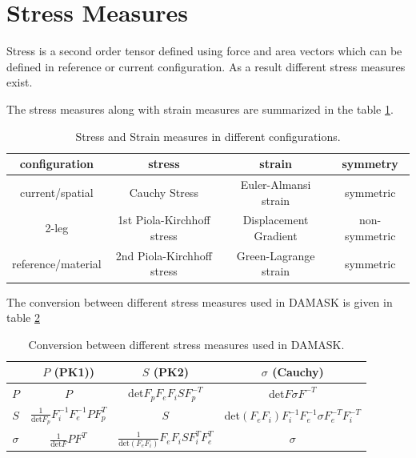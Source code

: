 \section{Stress Measures}
Stress is a second order tensor defined using force and area vectors which can be defined in reference or current configuration. As a result different stress measures exist.

The stress measures along with strain measures are summarized in the table \ref{Stress_Measures_Configurations}. 

\begin{table}[H]
\centering
\caption{Stress and Strain measures in different configurations.}
\renewcommand\arraystretch{1.4}
\renewcommand\baselinestretch{1.4}
\begin{tabular}{c|ccc}
    configuration & stress & strain & symmetry \\
    \hline
    current/spatial & Cauchy Stress & Euler-Almansi strain & symmetric \\
    2-leg & 1st Piola-Kirchhoff stress & Displacement Gradient & non-symmetric\\
    reference/material & 2nd Piola-Kirchhoff stress & Green-Lagrange strain & symmetric\\
\end{tabular}

\label{Stress_Measures_Configurations}
\end{table}

The conversion between different stress measures used in DAMASK is given in table \ref{Stress_measures}

\begin{table}[H]
\centering
\caption{Conversion between different stress measures used in DAMASK.}
\renewcommand\arraystretch{1.4}
\renewcommand\baselinestretch{1.4}
\begin{tabular}{c|c|c|c}
    & $P$ (PK1)) & $S$ (PK2) & $\sigma$ (Cauchy) \\
    \hline
    $P$ & $P$ & det$F_pF_eF_iSF_p^{-T}$ & det$F\sigma F^{-T}$ \\
    $S$ & $\frac{1}{\mbox{det} F_p}F_i^{-1}F_e^{-1}PF_p^T$ & $S$ & det$(F_eF_i)F_i^{-1}F_e^{-1}\sigma F_e^{-T}F_i^{-T}$\\
    $\sigma$ & $\frac{1}{\mbox{det}F}PF^T$ & $\frac{1}{\mbox{det} (F_eF_i)}F_eF_iSF_i^{T}F_e^{T}$ & $\sigma$\\
\end{tabular}

\label{Stress_measures}
\end{table}

